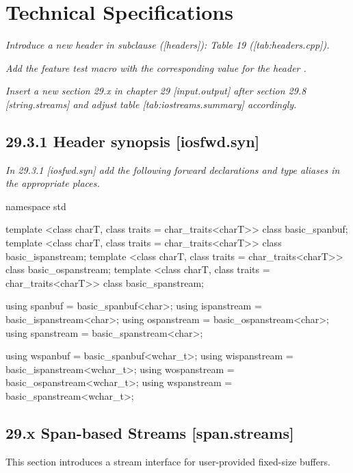 \documentclass[ebook,11pt,article]{memoir}
\begin{document}
\chapter{Technical Specifications}

\emph{Introduce a new header  in subclause ([headers]): Table 19 ([tab:headers.cpp]).}

\emph{Add the feature test macro  
with the corresponding value for the header .}

\emph{Insert a new section 29.x in chapter 29 [input.output] after section 29.8 [string.streams] and adjust table [tab:iostreams.summary] accordingly.}


\section{29.3.1 Header  synopsis [iosfwd.syn]}

\emph{In 29.3.1 [iosfwd.syn] add the following forward declarations and type aliases in the appropriate places.}

\begin{codeblock}
namespace std {
  template <class charT, class traits = char_traits<charT>>
    class basic_spanbuf;
  template <class charT, class traits = char_traits<charT>>
    class basic_ispanstream;
  template <class charT, class traits = char_traits<charT>>
    class basic_ospanstream;
  template <class charT, class traits = char_traits<charT>>
    class basic_spanstream;

  using spanbuf     = basic_spanbuf<char>;
  using ispanstream = basic_ispanstream<char>;
  using ospanstream = basic_ospanstream<char>;
  using spanstream  = basic_spanstream<char>;

  using wspanbuf     = basic_spanbuf<wchar_t>;
  using wispanstream = basic_ispanstream<wchar_t>;
  using wospanstream = basic_ospanstream<wchar_t>;
  using wspanstream  = basic_spanstream<wchar_t>;
}
\end{codeblock}



\section{29.x Span-based Streams [span.streams]}

\pnum
This section introduces a stream interface for user-provided fixed-size buffers. 
\end{document}
